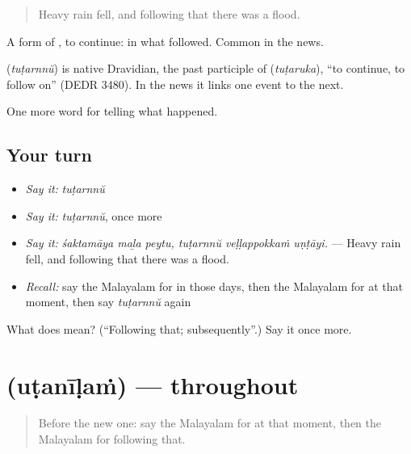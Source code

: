 \begin{quote}
Heavy rain fell, and following that there was a flood.
\end{quote}

A form of , to continue: in what followed. Common in the news.

\begin{cousinweb}
\textbf{} (\emph{tuṭarnnŭ}) is native Dravidian, the past participle of  (\emph{tuṭaruka}), \textquotedblleft{}to continue, to follow on\textquotedblright{} (DEDR 3480). In the news it links one event to the next.
\end{cousinweb}

\begin{grammarlens}[title={What you've built}]
One more word for telling what happened.
\end{grammarlens}

\subsection*{Your turn}
\begin{itemize}
\raggedright
  \item \emph{Say it:} \emph{tuṭarnnŭ}
  \item \emph{Say it:} \emph{tuṭarnnŭ}, once more
  \item \emph{Say it:} \emph{śaktamāya maḻa peytu, tuṭarnnŭ veḷḷappokkaṁ uṇṭāyi.} — Heavy rain fell, and following that there was a flood.
  \item \emph{Recall:} say the Malayalam for in those days, then the Malayalam for at that moment, then say \emph{tuṭarnnŭ} again
\end{itemize}

\begin{tcolorbox}[breakable,colback=teal!4,colframe=teal!35!black,title={Before you move on}]
What does  mean? (\textquotedblleft{}Following that; subsequently\textquotedblright{}.) Say it once more.
\end{tcolorbox}
\section[\texorpdfstring{\ml{ഉടനീളം} (uṭanīḷaṁ)}{ഉടനീളം (uṭanīḷaṁ)}]{ (uṭanīḷaṁ) — throughout}

\label{lesson:ML-C358-utanilam}



\begin{quote}
Before the new one: say the Malayalam for at that moment, then the Malayalam for following that.
\end{quote}

